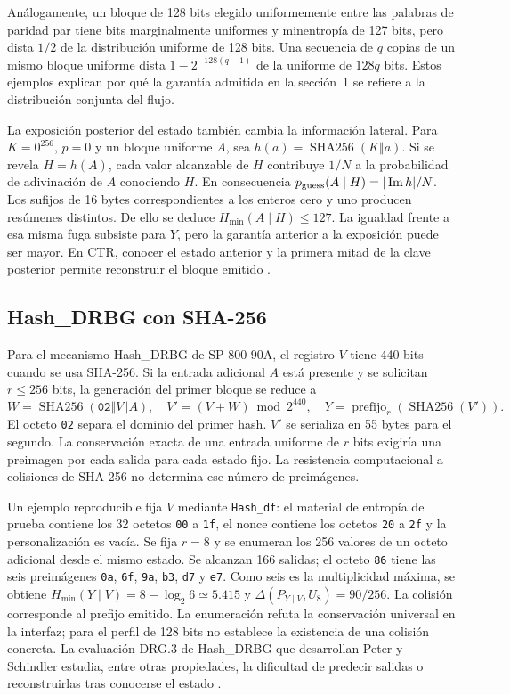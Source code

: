 \documentclass[11pt,a4paper]{article}
\newcommand{\HH}{\operatorname{SHA256}}
\newcommand{\cat}{\mathbin\Vert}
\begin{document}
Análogamente, un bloque de 128 bits elegido uniformemente entre las palabras de paridad par tiene bits marginalmente uniformes y minentropía de 127 bits, pero dista \(1/2\) de la distribución uniforme de 128 bits. Una secuencia de \(q\) copias de un mismo bloque uniforme dista \(1-2^{-128(q-1)}\) de la uniforme de \(128q\) bits. Estos ejemplos explican por qué la garantía admitida en la sección~1 se refiere a la distribución conjunta del flujo.

La exposición posterior del estado también cambia la información lateral. Para \(K=0^{256}\), \(p=0\) y un bloque uniforme \(A\), sea \(h(a)=\HH(K\cat a)\). Si se revela \(H=h(A)\), cada valor alcanzable de \(H\) contribuye \(1/N\) a la probabilidad de adivinación de \(A\) conociendo \(H\). En consecuencia \(p_{\rm guess}(A\mid H)=|\operatorname{Im}h|/N\). Los sufijos de 16 bytes correspondientes a los enteros cero y uno producen resúmenes distintos. De ello se deduce \(H_{\min}(A\mid H)\le127\). La igualdad frente a esa misma fuga subsiste para \(Y\), pero la garantía anterior a la exposición puede ser mayor. En CTR, conocer el estado anterior y la primera mitad de la clave posterior permite reconstruir el bloque emitido \cite{expediente}.

\subsection{Hash\_DRBG con SHA-256}
Para el mecanismo Hash\_DRBG de SP 800-90A, el registro \(V\) tiene 440 bits cuando se usa SHA-256. Si la entrada adicional \(A\) está presente y se solicitan \(r\le256\) bits, la generación del primer bloque se reduce a
\[
 W=\HH(\mathtt{02}\cat V\cat A),\quad V'=(V+W)\bmod 2^{440},
 \quad Y=\operatorname{prefijo}_r(\HH(V')) .
\]
El octeto \texttt{02} separa el dominio del primer hash. \(V'\) se serializa en 55 bytes para el segundo. La conservación exacta de una entrada uniforme de \(r\) bits exigiría una preimagen por cada salida para cada estado fijo. La resistencia computacional a colisiones de SHA-256 no determina ese número de preimágenes.

Un ejemplo reproducible fija \(V\) mediante \texttt{Hash\_df}: el material de entropía de prueba contiene los 32 octetos \texttt{00} a \texttt{1f}, el nonce contiene los octetos \texttt{20} a \texttt{2f} y la personalización es vacía. Se fija \(r=8\) y se enumeran los 256 valores de un octeto adicional desde el mismo estado. Se alcanzan 166 salidas; el octeto \texttt{86} tiene las seis preimágenes \texttt{0a}, \texttt{6f}, \texttt{9a}, \texttt{b3}, \texttt{d7} y \texttt{e7}. Como seis es la multiplicidad máxima, se obtiene \(H_{\min}(Y\mid V)=8-\log_2 6\simeq5.415\) y \(\Delta(P_{Y\mid V},U_8)=90/256\). La colisión corresponde al prefijo emitido. La enumeración refuta la conservación universal en la interfaz; para el perfil de 128 bits no establece la existencia de una colisión concreta. La evaluación DRG.3 de Hash\_DRBG que desarrollan Peter y Schindler estudia, entre otras propiedades, la dificultad de predecir salidas o reconstruirlas tras conocerse el estado \cite[sec.~5.3.1, párrs.~1009 y 1073--1075]{ais}.
\end{document}
